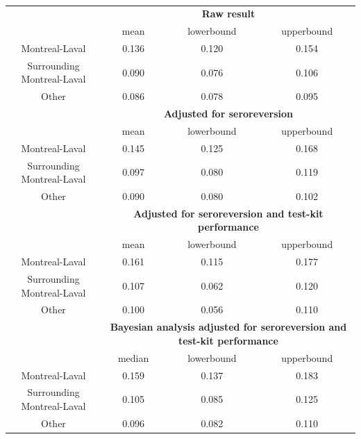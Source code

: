 \begin{table}[]
\centering
\caption{}
\label{tab:my-table}
\begin{tabular}{c|ccc}
                           & \multicolumn{3}{c}{\textbf{Raw result}}                                        \\
                           & mean                & lowerbound             & upperbound             \\
Montreal-Laval             & 0.136               & 0.120                  & 0.154                  \\
Surrounding Montreal-Laval & 0.090               & 0.076                  & 0.106                  \\
Other                      & 0.086               & 0.078                  & 0.095                  \\
\hline
                           & \multicolumn{3}{c}{\textbf{Adjusted for seroreversion}}                          \\
                           & mean                & lowerbound             & upperbound             \\
Montreal-Laval             & 0.145               & 0.125                  & 0.168                  \\
Surrounding Montreal-Laval & 0.097               & 0.080                  & 0.119                  \\
Other                      & 0.090               & 0.080                  & 0.102                  \\
\hline
                           & \multicolumn{3}{c}{\textbf{Adjusted for seroreversion and test-kit performance}} \\
                           & mean                & lowerbound             & upperbound             \\
Montreal-Laval             & 0.161               & 0.115                  & 0.177                  \\
Surrounding Montreal-Laval & 0.107               & 0.062                  & 0.120                  \\
Other                      & 0.100               & 0.056                  & 0.110                  \\
\hline
                           & \multicolumn{3}{c}{\textbf{Bayesian analysis adjusted for seroreversion and test-kit performance}}                                 \\
                           & median              & lowerbound             & upperbound             \\
Montreal-Laval             & 0.159               & 0.137                  & 0.183                  \\
Surrounding Montreal-Laval & 0.105               & 0.085                  & 0.125                  \\
Other                      & 0.096               & 0.082                  & 0.110                 
\end{tabular}
\end{table}

